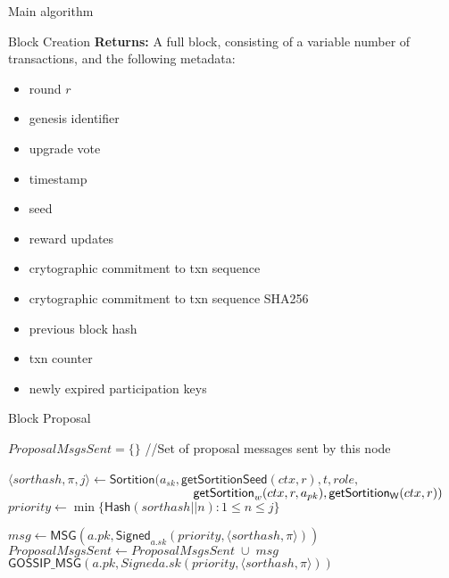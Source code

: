 \documentclass[10pt,a4paper]{article}
\begin{document}
\begin{section}{Main algorithm}
\begin{subsection}{Block Creation}
\noindent \textbf{Returns:} 
A full block, consisting of a variable number of transactions, and the following metadata:
\begin{itemize}
    \item round $r$
    \item genesis identifier
    \item upgrade vote
    \item timestamp
    \item seed
    \item reward updates
    \item crytographic commitment to txn sequence
    \item crytographic commitment to txn sequence SHA256
    \item previous block hash
    \item txn counter
    \item newly expired participation keys
  \end{itemize}

\end{subsection}
\begin{subsection}{Block Proposal}\label{ssect:blockproposal}

\begin{algorithm}
    \begin{algorithmic}[1]
        \State $ProposalMsgsSent = \{\}$ //Set of proposal messages sent by this node

            \State $\langle sorthash, \pi, j\rangle\gets 
            \mathsf{Sortition}(
                a_{sk}, 
                \mathsf{getSortitionSeed}(ctx, r), 
                t, 
                role, $ \newline
                ${}$ ${\hskip 5.2cm}\mathsf{getSortition}_w(ctx, r, a_{pk}), 
                \mathsf{getSortition_W}(ctx, r)
            )$
                \State $priority \gets \min\{\mathsf{Hash}(sorthash || n):1\le n\le j\}$

                \State $msg \gets \mathsf{MSG}(a.pk, \mathsf{Signed}_{a.sk}(priority, \langle sorthash, \pi\rangle))$
                \State $ProposalMsgsSent \gets  ProposalMsgsSent\;\cup\;msg$
                \State $\mathsf{GOSSIP\_MSG}(a.pk, Signed{a.sk}(priority, \langle sorthash, \pi\rangle))$
            \EndIf
        \EndFor \\


\end{algorithmic}
\end{algorithm}
\end{subsection}
\end{section}
\end{document}
